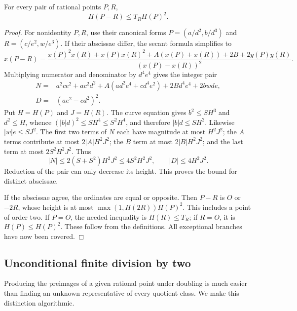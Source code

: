 \begin{lemma}\label{lem:translation}
For every pair of rational points $P,R$,
\[
                  H(P-R)\le T_R H(P)^2.
 \tag{4.20}\label{eq:translation}
\]
\end{lemma}
\begin{proof}
For nonidentity $P,R$, use their canonical forms
$P=(a/d^2,b/d^3)$ and $R=(c/e^2,w/e^3)$.
If their abscissae differ, the secant formula simplifies to
\[
 x(P-R)=
 \frac{x(P)^2x(R)+x(P)x(R)^2+
       A(x(P)+x(R))+2B+2y(P)y(R)}
      {(x(P)-x(R))^2}.
 \tag{4.21}
\]
Multiplying numerator and denominator by $d^4e^4$ gives the integer pair
\[
\begin{split}
 N={}&a^2ce^2+ac^2d^2
       +A(ad^2e^4+cd^4e^2)
       +2Bd^4e^4+2bwde,\\
 D={}&(ae^2-cd^2)^2.
\end{split}
\tag{4.22}\label{eq:ND}
\]
Put $H=H(P)$ and $J=H(R)$. The curve equation gives
$b^2\le SH^3$ and $d^2\le H$, whence
$(|b|d)^2\le SH^4\le S^2H^4$, and therefore $|b|d\le SH^2$.
Likewise $|w|e\le SJ^2$.
The first two terms of $N$ each have magnitude at most $H^2J^2$;
the $A$ terms contribute at most $2|A|H^2J^2$;
the $B$ term at most $2|B|H^2J^2$;
and the last term at most $2S^2H^2J^2$.
Thus
\[
 |N|\le2(S+S^2)H^2J^2\le4S^2H^2J^2,\qquad
 |D|\le4H^2J^2.
 \tag{4.23}
\]
Reduction of the pair can only decrease its height. This proves the bound
for distinct abscissae.

If the abscissae agree, the ordinates are equal or opposite.
Then $P-R$ is $O$ or $-2R$, whose height is at most
$\max(1,H(2R))H(P)^2$. This includes a point of order two.
If $P=O$, the needed inequality is $H(R)\le T_R$;
if $R=O$, it is $H(P)\le H(P)^2$. These follow from the definitions.
All exceptional branches have now been covered.
\end{proof}

\subsection{Unconditional finite division by two}
\label{subsec:halves}

Producing the preimages of a given rational point under doubling
is much easier than finding an unknown representative of every quotient
class. We make this distinction algorithmic.

